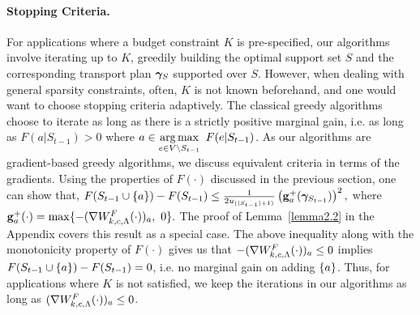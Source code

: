\paragraph{Stopping Criteria.} For applications where a budget constraint $K$ is pre-specified, our algorithms involve iterating up to $K$, greedily building the optimal support set $S$ and the corresponding transport plan $\bm{\gamma}_S$ supported over $S$. However, when dealing with general sparsity constraints, often, $K$ is not known beforehand, and one would want to choose stopping criteria adaptively. The classical greedy algorithms choose to iterate as long as there is a strictly positive marginal gain, i.e. as long as $F(a|S_{t-1})>0$ where $a\in \argmax_{e\in V\setminus S_{t-1}}\ F(e|S_{t-1})$. As our algorithms are gradient-based greedy algorithms, we discuss equivalent criteria in terms of the gradients. Using the properties of $F(\cdot)$ discussed in the previous section, one can show that,
$F(S_{t-1}\cup \{a\}) - F(S_{t-1})\leq \frac{1}{2u_{(|S_{t-1}|+1)}}\left(\mathbf{g}_a^+(\bm{\gamma}_{S_{t-1}})\right)^2,$
where $\mathbf{g}_a^+(\cdot)= \max\{-(\nabla W^F_{k, c, \Lambda}(\cdot))_a,\ 0\}.$
The proof of Lemma~\ref{lemma2.2} in the Appendix covers this result as a special case.
The above inequality along with the monotonicity property of $F(\cdot)$ gives us that $-(\nabla W^F_{k, c, \Lambda}(\cdot))_a\leq 0$ implies $F(S_{t-1}\cup \{a\}) - F(S_{t-1})=0$, i.e. no marginal gain on adding $\{a\}$. Thus, for applications where $K$ is not satisfied, we keep the iterations in our algorithms as long as $(\nabla W^F_{k, c, \Lambda}(\cdot))_a\leq 0$.
